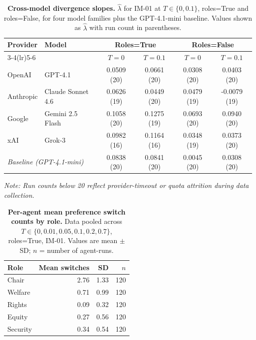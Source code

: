 \documentclass[11pt,onecolumn]{article}
\newcommand{\lam}{\ensuremath{\hat{\lambda}}}
\begin{document}
\begin{table}[H]
\caption{\textbf{Cross-model divergence slopes.}
  $\lam$ for IM-01 at $T \in \{0, 0.1\}$, roles=True and roles=False,
  for four model families plus the GPT-4.1-mini baseline.
  Values shown as $\lam$ with run count in parentheses.}
\label{tab:cross-model}
\small
\begin{tabular}{@{}llcccc@{}}
\toprule
\textbf{Provider} & \textbf{Model} & \multicolumn{2}{c}{\textbf{Roles=True}} & \multicolumn{2}{c}{\textbf{Roles=False}} \\
\cmidrule(lr){3-4}\cmidrule(lr){5-6}
& & $T=0$ & $T=0.1$ & $T=0$ & $T=0.1$ \\
\midrule
OpenAI     & GPT-4.1           & 0.0509 (20) & 0.0661 (20) & 0.0308 (20) & 0.0403 (20) \\
Anthropic  & Claude Sonnet 4.6 & 0.0626 (19) & 0.0449 (20) & 0.0479 (19) & -0.0079 (19) \\
Google     & Gemini 2.5 Flash  & 0.1058 (20) & 0.1275 (19) & 0.0693 (20) & 0.0940 (20) \\
xAI        & Grok-3            & 0.0982 (16) & 0.1164 (16) & 0.0348 (19) & 0.0373 (20) \\
\midrule
\multicolumn{2}{l}{\textit{Baseline (GPT-4.1-mini)}} & 0.0838 (20) & 0.0841 (20) & 0.0045 (20) & 0.0308 (20) \\
\bottomrule
\end{tabular}
\end{table}

\noindent\textit{Note: Run counts below 20 reflect provider-timeout or quota
attrition during data collection.}

\begin{table}[H]
\caption{\textbf{Per-agent mean preference switch counts by role.}
  Data pooled across $T \in \{0, 0.01, 0.05, 0.1, 0.2, 0.7\}$, roles=True,
  IM-01. Values are mean $\pm$ SD; $n$ = number of agent-runs.}
\label{tab:switch-counts}
\small
\begin{tabular}{@{}lrrr@{}}
\toprule
\textbf{Role} & \textbf{Mean switches} & \textbf{SD} & $n$ \\
\midrule
Chair    & 2.76 & 1.33 & 120 \\
Welfare  & 0.71 & 0.99 & 120 \\
Rights   & 0.09 & 0.32 & 120 \\
Equity   & 0.27 & 0.56 & 120 \\
Security & 0.34 & 0.54 & 120 \\
\bottomrule
\end{tabular}
\end{table}
\end{document}
